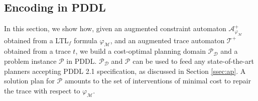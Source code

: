 \subsection{Encoding in PDDL}\label{ssec:eip}

\newcommand{\myi}{\emph{(i)}\xspace}
\newcommand{\myii}{\emph{(ii)}\xspace}
\newcommand{\myiii}{\emph{(iii)}\xspace}
\newcommand{\myiv}{\emph{(iv)}\xspace}
\newcommand{\myv}{\emph{(v)}\xspace}
\newcommand{\myvi}{\emph{(vi)}\xspace}
\newcommand{\A}{\mathcal{A}}
\newcommand{\T}{\mathcal{T}}
\newcommand{\PDDL}[1]{\begin{footnotesize}\texttt{#1}\end{footnotesize}}

In this section, we show how, given an augmented constraint automaton $\mathcal{A}_{\varphi_{\mathcal{M}}}^+$ obtained from a LTL$_f$ formula  $\varphi_{\mathcal{M}}$, and an augmented trace automaton $\T^+$ obtained from a trace $t$, we build a cost-optimal planning domain $\mathcal{P_D}$ and a problem instance $\mathcal{P}$ in PDDL. $\mathcal{P_D}$ and $\mathcal{P}$ can be used to feed any state-of-the-art planners accepting PDDL 2.1 specification, as discussed in Section \ref{ssec:ap}.
%
A solution plan for $\mathcal{P}$ amounts to the set of interventions of minimal cost to repair the trace with respect to $\varphi_{\mathcal{M}}$.

